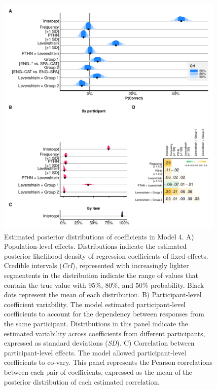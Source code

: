 \documentclass[
  english,
  man,floatsintext]{apa6}
\begin{document}
\begin{figure}
\centering
\includegraphics{manuscript_files/figure-latex/posteriorfix-1.pdf}
\caption{\label{fig:posteriorfix}Estimated posterior distributions of coefficients in Model 4. A) Population-level effects. Distributions indicate the estimated posterior likelihood density of regression coefficients of fixed effects. Credible intervals (\emph{CrI}), represented with increasingly lighter segmentents in the distribution indicate the range of values that contain the true value with 95\%, 80\%, and 50\% probability. Black dots represent the mean of each distribution. B) Participant-level coefficient variability. The model estimated participant-level coefficients to account for the dependency between responses from the same participant. Distributions in this panel indicate the estimated variability across coefficients from different participants, expressed as standard deviations (\emph{SD}). C) Correlation between participant-level effects. The model allowed participant-level coefficients to co-vary. This panel represents the Pearson correlations between each pair of coefficients, expressed as the mean of the posterior distribution of each estimated correlation.}
\end{figure}
\end{document}
